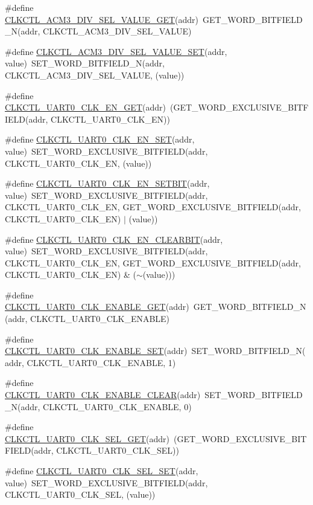 \begin{DoxyCompactItemize}
\item 
\#define \hyperlink{a00544_a8c045c53780fa3558d927aee82ecf1d6}{CLKCTL\_\-ACM3\_\-DIV\_\-SEL\_\-VALUE\_\-GET}(addr)~GET\_\-WORD\_\-BITFIELD\_\-N(addr, CLKCTL\_\-ACM3\_\-DIV\_\-SEL\_\-VALUE)
\item 
\#define \hyperlink{a00544_a1cc034b8fdfbc8064ba4e2d942c92221}{CLKCTL\_\-ACM3\_\-DIV\_\-SEL\_\-VALUE\_\-SET}(addr, value)~SET\_\-WORD\_\-BITFIELD\_\-N(addr, CLKCTL\_\-ACM3\_\-DIV\_\-SEL\_\-VALUE, (value))
\item 
\#define \hyperlink{a00544_a4650168b26ca8ad3021dbceb514ee3a1}{CLKCTL\_\-UART0\_\-CLK\_\-EN\_\-GET}(addr)~(GET\_\-WORD\_\-EXCLUSIVE\_\-BITFIELD(addr, CLKCTL\_\-UART0\_\-CLK\_\-EN))
\item 
\#define \hyperlink{a00544_a20c8ec873c23254eb8a56343a9c797a3}{CLKCTL\_\-UART0\_\-CLK\_\-EN\_\-SET}(addr, value)~SET\_\-WORD\_\-EXCLUSIVE\_\-BITFIELD(addr, CLKCTL\_\-UART0\_\-CLK\_\-EN, (value))
\item 
\#define \hyperlink{a00544_ae845e7ad5c75dc898a6ae70842ee4e9d}{CLKCTL\_\-UART0\_\-CLK\_\-EN\_\-SETBIT}(addr, value)~SET\_\-WORD\_\-EXCLUSIVE\_\-BITFIELD(addr, CLKCTL\_\-UART0\_\-CLK\_\-EN, GET\_\-WORD\_\-EXCLUSIVE\_\-BITFIELD(addr, CLKCTL\_\-UART0\_\-CLK\_\-EN) $|$ (value))
\item 
\#define \hyperlink{a00544_a55b6e6364f2452433ca003c1cd54fe8c}{CLKCTL\_\-UART0\_\-CLK\_\-EN\_\-CLEARBIT}(addr, value)~SET\_\-WORD\_\-EXCLUSIVE\_\-BITFIELD(addr, CLKCTL\_\-UART0\_\-CLK\_\-EN, GET\_\-WORD\_\-EXCLUSIVE\_\-BITFIELD(addr, CLKCTL\_\-UART0\_\-CLK\_\-EN) \& ($\sim$(value)))
\item 
\#define \hyperlink{a00544_acd0c0c907afdcd3a0c654318527e3d96}{CLKCTL\_\-UART0\_\-CLK\_\-ENABLE\_\-GET}(addr)~GET\_\-WORD\_\-BITFIELD\_\-N(addr, CLKCTL\_\-UART0\_\-CLK\_\-ENABLE)
\item 
\#define \hyperlink{a00544_acb486ac5563d36851659774a027a8816}{CLKCTL\_\-UART0\_\-CLK\_\-ENABLE\_\-SET}(addr)~SET\_\-WORD\_\-BITFIELD\_\-N(addr, CLKCTL\_\-UART0\_\-CLK\_\-ENABLE, 1)
\item 
\#define \hyperlink{a00544_a42ab828bc3df30849d88fbbac38a36b2}{CLKCTL\_\-UART0\_\-CLK\_\-ENABLE\_\-CLEAR}(addr)~SET\_\-WORD\_\-BITFIELD\_\-N(addr, CLKCTL\_\-UART0\_\-CLK\_\-ENABLE, 0)
\item 
\#define \hyperlink{a00544_a06320af0a231bdb6e353353249b02859}{CLKCTL\_\-UART0\_\-CLK\_\-SEL\_\-GET}(addr)~(GET\_\-WORD\_\-EXCLUSIVE\_\-BITFIELD(addr, CLKCTL\_\-UART0\_\-CLK\_\-SEL))
\item 
\#define \hyperlink{a00544_ae6201f5d6b8e5ad33c1a7007a7637329}{CLKCTL\_\-UART0\_\-CLK\_\-SEL\_\-SET}(addr, value)~SET\_\-WORD\_\-EXCLUSIVE\_\-BITFIELD(addr, CLKCTL\_\-UART0\_\-CLK\_\-SEL, (value))

\end{DoxyCompactItemize}
